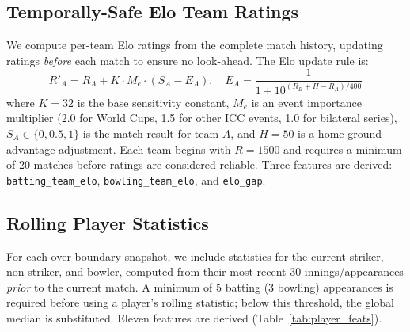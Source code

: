 \documentclass[12pt,a4paper,oneside]{report}
\begin{document}
\subsection{Temporally-Safe Elo Team Ratings}

We compute per-team Elo ratings from the complete match history, updating ratings \emph{before} each match to ensure no look-ahead.  The Elo update rule is:
\begin{equation}
R'_A = R_A + K \cdot M_e \cdot (S_A - E_A), \quad
E_A = \frac{1}{1 + 10^{(R_B + H - R_A)/400}}
\end{equation}
where $K=32$ is the base sensitivity constant, $M_e$ is an event importance multiplier (2.0 for World Cups, 1.5 for other ICC events, 1.0 for bilateral series), $S_A \in \{0, 0.5, 1\}$ is the match result for team $A$, and $H=50$ is a home-ground advantage adjustment.  Each team begins with $R=1500$ and requires a minimum of 20 matches before ratings are considered reliable.  Three features are derived: \texttt{batting\_team\_elo}, \texttt{bowling\_team\_elo}, and \texttt{elo\_gap}.

\subsection{Rolling Player Statistics}

For each over-boundary snapshot, we include statistics for the current striker, non-striker, and bowler, computed from their most recent 30 innings/appearances \emph{prior} to the current match.  A minimum of 5 batting (3 bowling) appearances is required before using a player's rolling statistic; below this threshold, the global median is substituted.  Eleven features are derived (Table~\ref{tab:player_feats}).
\end{document}
